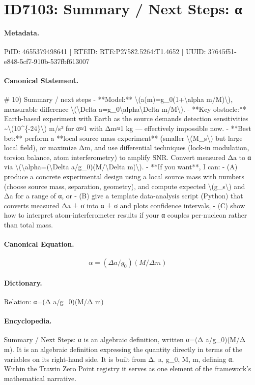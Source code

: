 \section*{ID7103: Summary / Next Steps: α}
\paragraph{Metadata.}
PiID: 4655379498641 | RTEID: RTE:P27582.5264:T1.4652 | UUID: 37645f51-e848-5cf7-910b-537fbf613007

\paragraph{Canonical Statement.}
\# 10) Summary / next steps - **Model:** \textbackslash{}(a(m)=g\_0(1+\textbackslash{}alpha m/M)\textbackslash{}), measurable difference \textbackslash{}(\textbackslash{}Delta a=g\_0\textbackslash{}alpha\textbackslash{}Delta m/M\textbackslash{}). - **Key obstacle:** Earth-based experiment with Earth as the source demands detection sensitivities \textasciitilde{}\textbackslash{}(10\textasciicircum{}\{-24\}\textbackslash{}) m/s² for α≈1 with Δm≈1 kg — effectively impossible now. - **Best bet:** perform a **local source mass experiment** (smaller \textbackslash{}(M\_s\textbackslash{}) but large local field), or maximize Δm, and use differential techniques (lock-in modulation, torsion balance, atom interferometry) to amplify SNR. Convert measured Δa to α via \textbackslash{}(\textbackslash{}alpha=(\textbackslash{}Delta a/g\_0)(M/\textbackslash{}Delta m)\textbackslash{}). - **If you want**, I can: - (A) produce a concrete experimental design using a local source mass with numbers (choose source mass, separation, geometry), and compute expected \textbackslash{}(g\_s\textbackslash{}) and Δa for a range of α, or - (B) give a template data-analysis script (Python) that converts measured Δa ± σ into α ± σ and plots confidence intervals, - (C) show how to interpret atom-interferometer results if your α couples per-nucleon rather than total mass.

\paragraph{Canonical Equation.}
\[
\alpha=(\Delta a/g_0)(M/\Delta m)
\]

\paragraph{Dictionary.}
Relation: α=(Δ a/g\_0)(M/Δ m)

\paragraph{Encyclopedia.}
Summary / Next Steps: α is an algebraic definition, written α=(Δ a/g\_0)(M/Δ m). It is an algebraic definition expressing the quantity directly in terms of the variables on its right-hand side. It is built from Δ, a, g\_0, M, m, defining α. Within the Trawin Zero Point registry it serves as one element of the framework's mathematical narrative.
